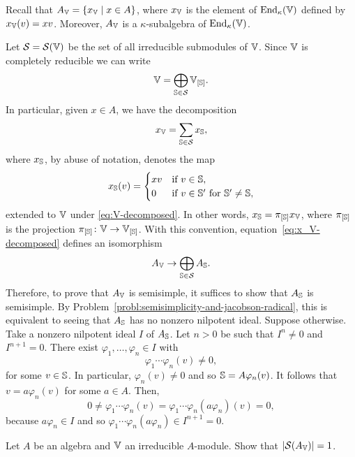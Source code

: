 \begin{solution}
    Recall that $A_\mathbb V=\{x_\mathbb V\mid x\in A\}$, where $x_\mathbb V$ is the element of ${\operatorname{End}}_\kappa(\mathbb V)$ defined by $x_\mathbb V(v)=xv$. Moreover, $A_\mathbb V$ is a $\kappa$-subalgebra of ${\operatorname{End}}_\kappa(\mathbb V)$.

    Let $\mathcal S=\mathcal S(\mathbb V)$ be the set of all irreducible submodules of $\mathbb V$. Since $\mathbb V$ is completely reducible we can write
    \begin{equation}\label{eq:V-decomposed}
        \mathbb V = \bigoplus_{\mathbb S\in\mathcal S}\mathbb V_{[\mathbb S]}.
    \end{equation}
    In particular, given $x\in A$, we have the decomposition
    \begin{equation}\label{eq:x_V-decomposed}
        x_\mathbb V = \sum_{\mathbb S\in\mathcal S}x_\mathbb S,
    \end{equation}
    where $x_\mathbb S$, by abuse of notation, denotes the map
    $$
        x_\mathbb S(v) = \begin{cases}
            xv  &\text{if }v\in\mathbb S,\\
            0   &\text{if }v\in\mathbb S' \text{ for }\mathbb S'\ne\mathbb S,
        \end{cases}
    $$
    extended to $\mathbb V$ under \eqref{eq:V-decomposed}. In other words, $x_\mathbb S=\pi_{[\mathbb S]} x_\mathbb V$, where $\pi_{[\mathbb S]}$ is the projection $\pi_{[\mathbb S]}\colon\mathbb V\to\mathbb V_{[\mathbb S]}$. With this convention, equation~\eqref{eq:x_V-decomposed} defines an isomorphism
    \begin{equation}\label{eq:A_V-decomposed}
        A_\mathbb V\to\bigoplus_{\mathbb S\in\mathcal S}A_\mathbb S.
    \end{equation}
    Therefore, to prove that $A_\mathbb V$ is semisimple, it suffices to show that $A_\mathbb S$ is semisimple. By Problem~\ref{probl:semisimplicity-and-jacobson-radical}, this is equivalent to seeing that $A_\mathbb S$ has no nonzero nilpotent ideal. Suppose otherwise. Take a nonzero nilpotent ideal $I$ of $A_\mathbb S$. Let $n>0$ be such that $I^n\ne0$ and $I^{n+1}=0$. There exist $\varphi_1,\dots,\varphi_n\in I$ with
    $$
        \varphi_1\cdots\varphi_n(v)\ne0,
    $$
    for some $v\in\mathbb S$. In particular, $\varphi_n(v)\ne0$ and so $\mathbb S=A\varphi_n(v)$. It follows that $v=a\varphi_n(v)$ for some $a\in A$. Then,
    $$
        0\ne\varphi_1\cdots\varphi_n(v)
            = \varphi_1\cdots \varphi_n(a\varphi_n)(v)
            = 0,
    $$
    because $a\varphi_n\in I$ and so $\varphi_1\cdots \varphi_n(a\varphi_n)\in I^{n+1}=0$.
\end{solution}

\begin{probl}
    Let\/ $A$ be an algebra and\/ $\mathbb V$ an irreducible\/ $A$-module. Show that\/ $|\mathcal S(A_\mathbb V)|=1$.
\end{probl}

